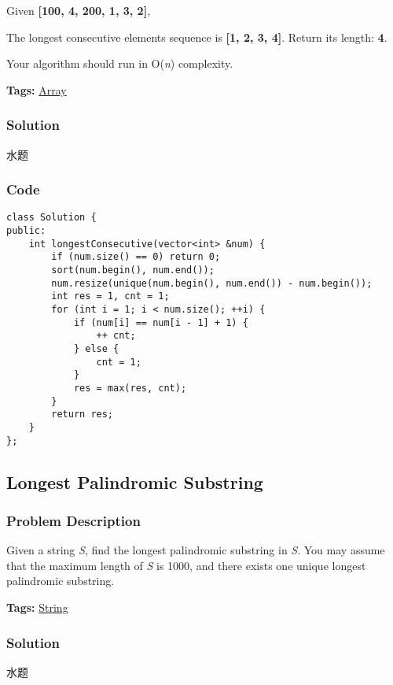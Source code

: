 \documentclass{article}
\begin{document}
\begin{CJK*}{UTF8}{gkai}
Given \textbf{[100, 4, 200, 1, 3, 2]},


The longest consecutive elements sequence is \textbf{[1, 2, 3, 4]}. Return its length: \textbf{4}.

Your algorithm should run in O(\emph{n}) complexity.


\textbf{Tags: }
\hyperref[ Array ]{ Array }



\subsubsection*{Solution}
水题

\subsubsection*{Code}
\begin{lstlisting}
class Solution {
public:
    int longestConsecutive(vector<int> &num) {
        if (num.size() == 0) return 0;
        sort(num.begin(), num.end());
        num.resize(unique(num.begin(), num.end()) - num.begin());
        int res = 1, cnt = 1;
        for (int i = 1; i < num.size(); ++i) {
            if (num[i] == num[i - 1] + 1) {
                ++ cnt;
            } else {
                cnt = 1;
            }
            res = max(res, cnt);
        }
        return res;        
    }
};

\end{lstlisting}


\subsection{ Longest Palindromic Substring }
\label{ Longest Palindromic Substring }

\subsubsection*{Problem Description}
Given a string \emph{S}, find the longest palindromic substring in \emph{S}. You may assume that the maximum length of \emph{S} is 1000, and there exists one unique longest palindromic substring.


\textbf{Tags: }
\hyperref[ String ]{ String }



\subsubsection*{Solution}
水题


\end{CJK*}
\end{document}
